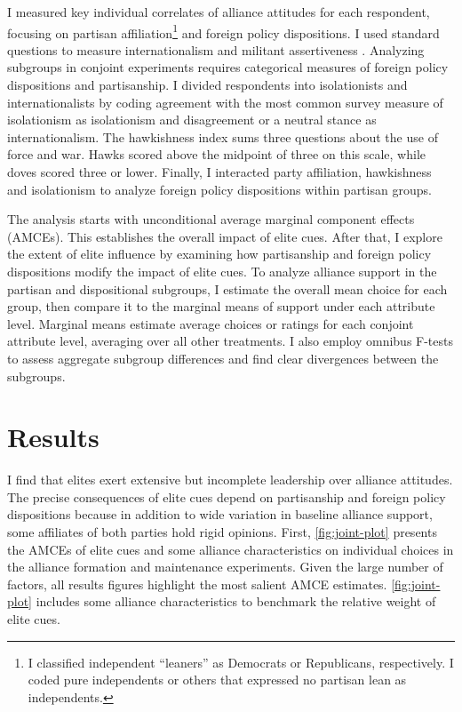 \documentclass[12pt]{article}
\begin{document}
I measured key individual correlates of alliance attitudes for each respondent, focusing on partisan affiliation\footnote{I classified independent ``leaners'' as Democrats or Republicans, respectively. I coded pure independents or others that expressed no partisan lean as independents.} and foreign policy dispositions. 
I used standard questions to measure internationalism and militant assertiveness \citep{KertzerBrutger2016}.
Analyzing subgroups in conjoint experiments requires categorical measures of foreign policy dispositions and partisanship. 
I divided respondents into isolationists and internationalists by coding agreement with the most common survey measure of isolationism as isolationism and disagreement or a neutral stance as internationalism. 
The hawkishness index sums three questions about the use of force and war. 
Hawks scored above the midpoint of three on this scale, while doves scored three or lower. 
Finally, I interacted party affiliation, hawkishness and isolationism to analyze foreign policy dispositions within partisan groups.


The analysis starts with unconditional average marginal component effects (AMCEs).
This establishes the overall impact of elite cues. 
After that, I explore the extent of elite influence by examining how partisanship and foreign policy dispositions modify the impact of elite cues. 
To analyze alliance support in the partisan and dispositional subgroups, I estimate the overall mean choice for each group, then compare it to the marginal means of support under each attribute level.
Marginal means estimate average choices or ratings for each conjoint attribute level, averaging over all other treatments. 
I also employ omnibus F-tests to assess aggregate subgroup differences \citep{Leeperetal2020} and find clear divergences between the subgroups.  


\section{Results} 


I find that elites exert extensive but incomplete leadership over alliance attitudes.
The precise consequences of elite cues depend on partisanship and foreign policy dispositions because in addition to wide variation in baseline alliance support, some affiliates of both parties hold rigid opinions. 
First, \autoref{fig:joint-plot} presents the AMCEs of elite cues and some alliance characteristics on individual choices in the alliance formation and maintenance experiments.
Given the large number of factors, all results figures highlight the most salient AMCE estimates.
\autoref{fig:joint-plot} includes some alliance characteristics to benchmark the relative weight of elite cues.
\end{document}
